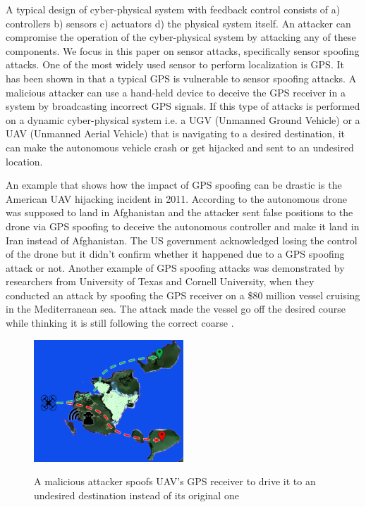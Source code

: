 \documentclass[conference]{IEEEtran}
\begin{document}
A typical design of cyber-physical system with feedback control consists of a) controllers b) sensors c) actuators d) the physical system itself. An attacker can compromise the operation of the cyber-physical system by attacking any of these components. We focus in this paper on sensor attacks, specifically sensor spoofing attacks. One of the most widely used sensor to perform localization is GPS. It has been shown in \cite{humphreys2008assessing} that a typical GPS is vulnerable to sensor spoofing attacks. A malicious attacker can use a hand-held device to deceive the GPS receiver in a system by broadcasting incorrect GPS signals. If this type of attacks is performed on a dynamic cyber-physical system i.e. a UGV (Unmanned Ground Vehicle) or a UAV (Unmanned Aerial Vehicle) that is navigating to a desired destination, it can make the autonomous vehicle crash or get hijacked and sent to an undesired location.

An example that shows how the impact of GPS spoofing can be drastic is the American UAV hijacking incident in 2011. According to \cite{peterson_faramarzi_2011} the autonomous drone was supposed to land in Afghanistan and the attacker sent false positions to the drone via GPS spoofing to deceive the autonomous controller and make it land in Iran instead of Afghanistan. The US government acknowledged losing the control of the drone but it didn't confirm whether it happened due to a GPS spoofing attack or not. Another example of GPS spoofing attacks was demonstrated by researchers from University of Texas and Cornell University, when they conducted an attack by spoofing the GPS receiver on a \$80 million vessel cruising in the Mediterranean sea. The attack made the vessel go off the desired course while thinking it is still following the correct coarse \cite{protecting_gps_2016}.

\begin{figure}[h]
\caption{A malicious attacker spoofs UAV's  GPS receiver to drive it to an undesired destination instead of its original one}
\centering
\includegraphics[width=0.5\textwidth]{problem}
 \label{fig:problem}
\end{figure}
\end{document}

